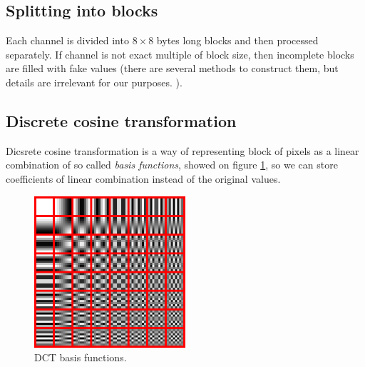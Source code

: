 \subsection{Splitting into blocks}

Each channel is divided into $8 \times 8$ bytes long blocks and 
then processed separately. If channel is not exact multiple of block size,
then incomplete blocks are filled with fake values (there are several
methods to construct them, but details are irrelevant for our purposes. 
).

\subsection{Discrete cosine transformation}

Dicsrete cosine transformation is a way of representing block of pixels as 
a linear combination of so called \textit{basis functions}, showed on figure \ref{img:DCTbf},
so we can store coefficients of linear combination instead of the original values.

\begin{figure}
\centerline{\includegraphics[width=0.5\textwidth]{images/Dctjpeg.png}}
\caption[DCT basis functions (Public domain)]{DCT basis functions.}
\label{img:DCTbf}
\end{figure}



